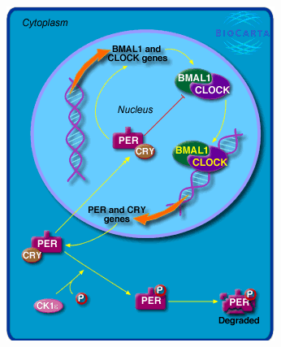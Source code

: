\documentclass[xcolor={usenames,dvipsnames,svgnames},url=hyphens]{beamer}
\begin{document}
\begin{frame}
\begin{columns}[c]
\begin{column}[c]{0.3\textwidth}
            \includegraphics[width=\textwidth]{h_circadianPathway.png} \footnotesize{\cite{biocarta}}
        \end{column}
    \end{columns}
    \vspace{1.5cm}
\end{frame}
\end{document}
